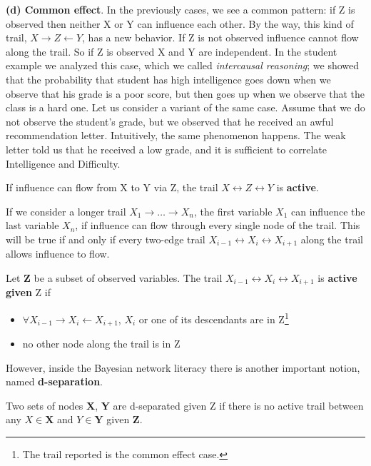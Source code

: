 \textbf{(d) Common effect}. In the previously cases, we see a common pattern: if Z is observed then neither X or Y can influence each other. By the way, this kind of trail, 
$X \rightarrow Z \leftarrow Y$, has a new behavior. If Z is not observed influence cannot flow along the trail. So if Z is observed X and Y are independent. In the student example
we analyzed this case, which we called \textit{intercausal reasoning}; we showed that the probability that student has high intelligence goes down when we observe that his grade is 
a poor score, but then goes up when we observe that the class is a hard one. Let us consider a variant of the same case. Assume that we do not observe the student's grade, but we observed
that he received an awful recommendation letter. Intuitively, the same phenomenon happens. The weak letter told us that he received a low grade, and it is sufficient to 
correlate Intelligence and Difficulty.  
\begin{definition}
    If influence can flow from X to Y via Z, the trail $X \longleftrightarrow Z \longleftrightarrow Y$ is \textbf{active}.
\end{definition}
If we consider a longer trail $X_1 \rightarrow \dots \rightarrow X_n$, the first variable $X_1$ can influence the last variable $X_n$, if influence can flow through every single node of the trail.
This will be true if and only if every two-edge trail $X_{i-1} \longleftrightarrow X_i \longleftrightarrow X_{i+1}$ along the trail allows influence to flow.
\begin{definition}
    Let \textbf{Z} be a subset of observed variables. The trail $X_{i-1} \longleftrightarrow X_i \longleftrightarrow X_{i+1}$ is \textbf{active given} Z if
    \begin{itemize}
        \renewcommand{\labelitemi}{-}
        \item $\forall X_{i-1} \rightarrow X_i \leftarrow X_{i+1}$, $X_i$ or one of its descendants are in Z\footnote{The trail reported is the common effect case.}
        \item no other node along the trail is in Z
    \end{itemize}
\end{definition}
However, inside the Bayesian network literacy there is another important notion, named \textbf{d-separation}.
\begin{definition}
    Two sets of nodes \textbf{X}, \textbf{Y} are d-separated given Z if there is no active trail between any $X \in \mathbf{X}$ and $Y \in \mathbf{Y}$ given \textbf{Z}.
\end{definition}
